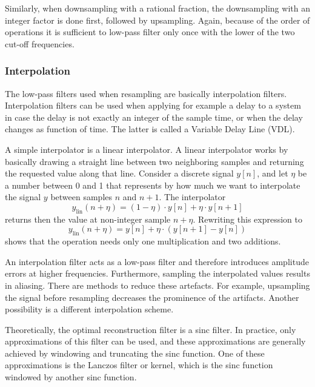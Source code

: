 Similarly, when downsampling with a rational fraction, the downsampling with an
integer factor is done first, followed by upsampling. Again, because of the
order of operations it is sufficient to low-pass filter only once with the lower
of the two cut-off frequencies.

\subsubsection{Interpolation} %
The low-pass filters used when resampling are basically interpolation filters.
Interpolation filters can be used when applying for example a delay to a system in case
the delay is not exactly an integer of the sample time, or when the delay
changes as function of time. The latter is called a Variable Delay Line (VDL).

A simple interpolator is a linear interpolator. A linear interpolator works by
basically drawing a straight line between two neighboring samples and returning
the requested value along that line. Consider a discrete signal $y[n]$, and let
$\eta$ be a number between 0 and 1 that represents by how much we want to
interpolate the signal $y$ between samples $n$ and $n+1$. The interpolator
\begin{equation}
  y_{\mathrm{lin}} (n + \eta) = (1-\eta) \cdot y[n] + \eta \cdot y[n+1]
\end{equation}
returns then the value at non-integer sample $n+\eta$. Rewriting this expression to
\begin{equation}\label{eq:theory:signal:resampling:interpolation-linear}
  y_{\mathrm{lin}} (n + \eta) = y[n] + \eta \cdot \left( y[n+1] - y[n] \right)
\end{equation}
shows that the operation needs only one multiplication and two additions.

An interpolation filter acts as a low-pass filter and therefore introduces
amplitude errors at higher frequencies. Furthermore, sampling the interpolated
values results in aliasing. There are methods to reduce these artefacts. For
example, upsampling the signal before resampling decreases the prominence of the
artifacts. Another possibility is a different interpolation scheme.

Theoretically, the optimal reconstruction filter is a sinc filter. In practice,
only approximations of this filter can be used, and these approximations are
generally achieved by windowing and truncating the sinc function. One of these
approximations is the Lanczos filter or kernel, which is the sinc function
windowed by another sinc function.

